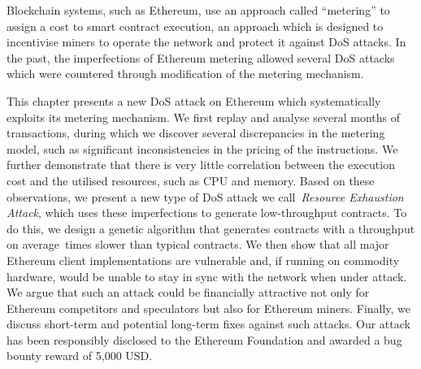 Blockchain systems, such as Ethereum, use an approach called ``metering'' to assign a cost to smart contract execution, an approach which is designed to incentivise miners to operate the network and protect it against DoS attacks. In the past, the imperfections of Ethereum metering allowed several DoS attacks which were countered through modification of the metering mechanism.

This chapter presents a new DoS attack on Ethereum which systematically exploits its metering mechanism. We first replay and analyse several months of transactions, during which we discover several discrepancies in the metering model, such as significant inconsistencies in the pricing of the instructions.
We further demonstrate that there is very little correlation between the execution cost and the utilised resources, such as CPU and memory. Based on these observations, we present a new type of DoS attack we call~\emph{Resource Exhaustion Attack}, which uses these imperfections to generate low-throughput contracts.
To do this, we design a genetic algorithm that generates contracts with a throughput on average~\Slowdown times slower than typical contracts. We then show that all major Ethereum client implementations are vulnerable and, if running on commodity hardware, would be unable to stay in sync with the network when under attack.
We argue that such an attack could be financially attractive not only for Ethereum competitors and speculators but also for Ethereum miners. Finally, we discuss short-term and potential long-term fixes against such attacks. Our attack has been responsibly disclosed to the Ethereum Foundation and awarded a bug bounty reward of 5,000 USD.

